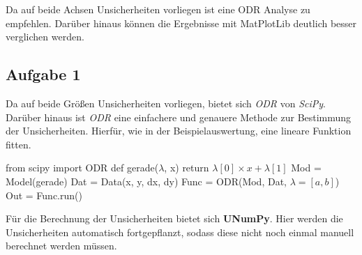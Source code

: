 \documentclass[a4paper,12pt]{article}
\begin{document}
\begin{center}
\begin{tcolorbox}[colback=gray!20, colframe=red, width=0.8\textwidth, boxrule=1pt, arc=1mm]
Da auf beide Achsen Unsicherheiten vorliegen ist eine ODR Analyse zu empfehlen. Darüber hinaus können die Ergebnisse mit MatPlotLib deutlich besser verglichen werden.
\end{tcolorbox}
\end{center}

\subsection{Aufgabe 1}
Da auf beide Größen Unsicherheiten vorliegen, bietet sich \textit{ODR} von \textit{SciPy}. Darüber hinaus ist \textit{ODR} eine einfachere und genauere Methode zur Bestimmung der Unsicherheiten. Hierfür, wie in der Beispielauswertung, eine lineare Funktion fitten. \newline
\begin{center}
\begin{tcolorbox}[colback=gray!20, colframe=black, width=1\textwidth, boxrule=1pt, arc=1mm]
from scipy import ODR \newline
def gerade($\lambda$, x) \newline
\hspace*{1cm} return $\lambda[0] \times x + \lambda[1]$ \newline
Mod = Model(gerade) \newline
Dat = Data(x, y, dx, dy) \newline
Func = ODR(Mod, Dat, $\lambda=[a, b]$) \newline
Out = Func.run()
\end{tcolorbox}
\end{center}
Für die Berechnung der Unsicherheiten bietet sich \textbf{UNumPy}. Hier werden die Unsicherheiten automatisch fortgepflanzt, sodass diese nicht noch einmal manuell berechnet werden müssen.
\end{document}

